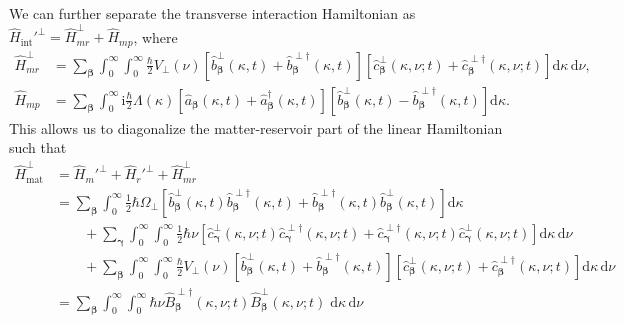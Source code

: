 \documentclass{article}
\begin{document}
We can further separate the transverse interaction Hamiltonian as $\hat{H}_\mathrm{int}'^\perp = \hat{H}_{mr}^\perp + \hat{H}_{mp}$, where
\begin{equation}
\begin{split}
\hat{H}_{mr}^\perp &= \sum_{\bm{\beta}}\int_0^\infty\int_0^\infty\frac{\hbar}{2}V_\perp(\nu)\left[\hat{b}_{\bm{\beta}}^\perp(\kappa,t) + \hat{b}_{\bm{\beta}}^{\perp\dagger}(\kappa,t)\right]\left[\hat{c}_{\bm{\beta}}^\perp(\kappa,\nu;t) + \hat{c}_{\bm{\beta}}^{\perp\dagger}(\kappa,\nu;t)\right]\mathrm{d}\kappa\,\mathrm{d}\nu,\\
\hat{H}_{mp} &= \sum_{\bm{\beta}}\int_0^\infty\mathrm{i}\frac{\hbar}{2}\Lambda(\kappa)\left[\hat{a}_{\bm{\beta}}(\kappa,t) + \hat{a}_{\bm{\beta}}^\dagger(\kappa,t)\right]\left[\hat{b}_{\bm{\beta}}^\perp(\kappa,t) - \hat{b}_{\bm{\beta}}^{\perp\dagger}(\kappa,t)\right]\mathrm{d}\kappa.
\end{split}
\end{equation}
This allows us to diagonalize the matter-reservoir part of the linear Hamiltonian such that
\begin{equation}
\begin{split}
\hat{H}_\mathrm{mat}^\perp &= \hat{H}_m'^\perp + \hat{H}_r'^\perp + \hat{H}_{mr}^\perp\\
&= \sum_{\bm{\beta}}\int_0^\infty\frac{1}{2}\hbar\Omega_\perp\left[\hat{b}_{\bm{\beta}}^\perp(\kappa,t)\hat{b}_{\bm{\beta}}^{\perp\dagger}(\kappa,t) + \hat{b}_{\bm{\beta}}^{\perp\dagger}(\kappa,t)\hat{b}_{\bm{\beta}}^\perp(\kappa,t)\right]\mathrm{d}\kappa\\
&\qquad + \sum_{\bm{\gamma}}\int_0^\infty\int_0^\infty\frac{1}{2}\hbar\nu\left[\hat{c}_{\bm{\gamma}}^\perp(\kappa,\nu;t)\hat{c}_{\bm{\gamma}}^{\perp\dagger}(\kappa,\nu;t) + \hat{c}_{\bm{\gamma}}^{\perp\dagger}(\kappa,\nu;t)\hat{c}_{\bm{\gamma}}^\perp(\kappa,\nu;t)\right]\mathrm{d}\kappa\,\mathrm{d}\nu\\
&\qquad + \sum_{\bm{\beta}}\int_0^\infty\int_0^\infty\frac{\hbar}{2}V_\perp(\nu)\left[\hat{b}_{\bm{\beta}}^\perp(\kappa,t) + \hat{b}_{\bm{\beta}}^{\perp\dagger}(\kappa,t)\right]\left[\hat{c}_{\bm{\beta}}^\perp(\kappa,\nu;t) + \hat{c}_{\bm{\beta}}^{\perp\dagger}(\kappa,\nu;t)\right]\mathrm{d}\kappa\,\mathrm{d}\nu\\
&= \sum_{\bm{\beta}}\int_0^\infty\int_0^\infty\hbar\nu\hat{B}_{\bm{\beta}}^{\perp\dagger}(\kappa,\nu;t)\hat{B}_{\bm{\beta}}^{\perp}(\kappa,\nu;t)\;\mathrm{d}\kappa\,\mathrm{d}\nu
\end{split}
\end{equation}
\end{document}
